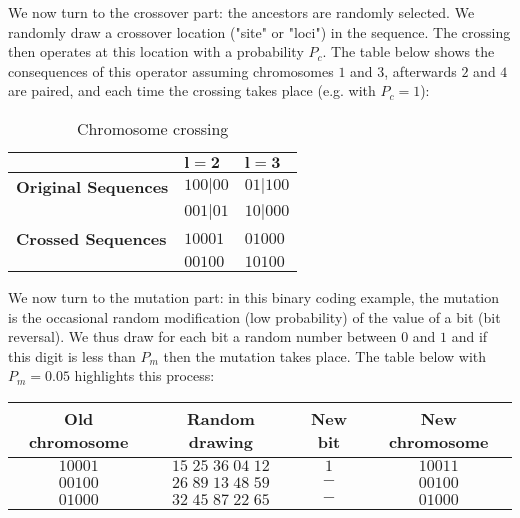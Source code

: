 \begin{tcolorbox}[colframe=black,colback=white,sharp corners]
\begin{enumerate}
		We now turn to the crossover part: the ancestors are randomly selected. We randomly draw a crossover location ("site" or "loci") in the sequence. The crossing then operates at this location with a probability $P_c$. The table below shows the consequences of this operator assuming chromosomes $1$ and $3$, afterwards $2$ and $4$ are paired, and each time the crossing takes place (e.g. with $P_c=1$):
	\end{enumerate}
	\end{tcolorbox}
	
	\begin{tcolorbox}[colframe=black,colback=white,sharp corners]
	\begin{table}[H]
		\centering
		\begin{tabular}{|l|l|l|}
		\hline
	    \cellcolor{black!30}& \cellcolor{black!30}$\pmb{l=2}$ & \cellcolor{black!30}$\pmb{l=3}$  \\ \hline
		\textbf{Original Sequences}\multirow{2}{*}{\cellcolor{black!30}} & $100|00$  & $01|100$  \\ 
		\cellcolor{black!30} & $001|01$ & $10|000$  \\ \hline
		\textbf{Crossed Sequences}\multirow{2}{*}{\cellcolor{black!30}} & $10001$  & $01000$  \\ 
		 \cellcolor{black!30} & $00100$ & $10100$ \\ \hline
		\end{tabular}
		\caption[]{Chromosome crossing}
	\end{table}
	We now turn to the mutation part: in this binary coding example, the mutation is the occasional random modification (low probability) of the value of a bit (bit reversal). We thus draw for each bit a random number between $0$ and $1$ and if this digit is less than $P_m$ then the mutation takes place. The table below with $P_m=0.05$ highlights this process:
	\begin{table}[H]
		\begin{center}
		\begin{tabular}{|c|c|c|c|}
		\hline
		\cellcolor{black!30}\textbf{Old chromosome} & 
		\cellcolor{black!30}\textbf{Random drawing} & \cellcolor{black!30}\textbf{New bit} & \cellcolor{black!30}\textbf{New chromosome} \\ \hline
		$10001$ & $15\;25\;36\;\mathit{04}\;12$ & $1$ & $10011$  \\ \hline
		$00100$ & $26\;89\;13\;48\;59$ & $-$ & $00100$  \\ \hline
		$01000$ & $32\;45\;87\;22\;65$ & $-$ & $01000$  \\ \hline

\end{tabular}
\end{center}
\end{table}
\end{tcolorbox}
